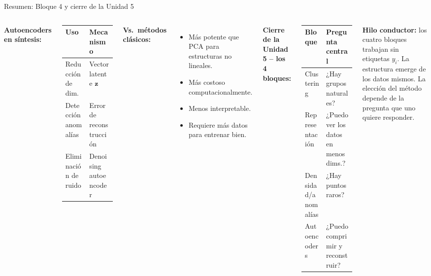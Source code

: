 \documentclass[aspectratio=169]{beamer}
\begin{document}
\begin{frame}{Resumen: Bloque 4 y cierre de la Unidad 5}

\begin{columns}[T]
\textbf{Autoencoders en síntesis:}

\medskip
{\small
\begin{tabular}{ll}
\toprule
\textbf{Uso} & \textbf{Mecanismo} \\
\midrule
Reducción de dim. & Vector latente $\mathbf{z}$ \\
Detección anomalías & Error de reconstrucción \\
Eliminación de ruido & Denoising autoencoder \\
\bottomrule
\end{tabular}
}

\medskip
\textbf{Vs.\ métodos clásicos:}
\begin{itemize}
  \item Más potente que PCA para estructuras no lineales.
  \item Más costoso computacionalmente.
  \item Menos interpretable.
  \item Requiere más datos para entrenar bien.
\end{itemize}

\textbf{Cierre de la Unidad 5 -- los 4 bloques:}

\medskip
{\small
\begin{tabular}{ll}
\toprule
\textbf{Bloque} & \textbf{Pregunta central} \\
\midrule
Clustering & ¿Hay grupos naturales? \\
Representación & ¿Puedo ver los datos en menos dims.? \\
Densidad/anomalías & ¿Hay puntos raros? \\
Autoencoders & ¿Puedo comprimir y reconstruir? \\
\bottomrule
\end{tabular}
}

\medskip
\textbf{Hilo conductor:} los cuatro bloques trabajan sin etiquetas $y_i$. La estructura emerge de los datos mismos. La elección del método depende de la pregunta que uno quiere responder.
\end{columns}
\end{frame}
\end{document}
